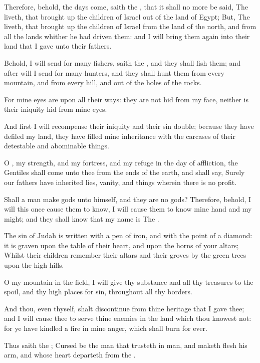 \Verse Therefore, behold, the days come, saith the \LORD, that it shall no more be said, The \LORD liveth, that brought up the children of Israel out of the land of Egypt; \Verse But, The \LORD liveth, that brought up the children of Israel from the land of the north, and from all the lands whither he had driven them: and I will bring them again into their land that I gave unto their fathers.

\Verse Behold, I will send for many fishers, saith the \LORD, and they shall fish them; and after will I send for many hunters, and they shall hunt them from every mountain, and from every hill, and out of the holes of the rocks.

\Verse For mine eyes are upon all their ways: they are not hid from my face, neither is their iniquity hid from mine eyes.

\Verse And first I will recompense their iniquity and their sin double; because they have defiled my land, they have filled mine inheritance with the carcases of their detestable and abominable things.

\Verse O \LORD, my strength, and my fortress, and my refuge in the day of affliction, the Gentiles shall come unto thee from the ends of the earth, and shall say, Surely our fathers have inherited lies, vanity, and things wherein there is no profit.

\Verse Shall a man make gods unto himself, and they are no gods?  \Verse Therefore, behold, I will this once cause them to know, I will cause them to know mine hand and my might; and they shall know that my name is The \LORD.


\Chapter
\Verse The sin of Judah is written with a pen of iron, and with the point of a diamond: it is graven upon the table of their heart, and upon the horns of your altars; \Verse Whilst their children remember their altars and their groves by the green trees upon the high hills.

\Verse O my mountain in the field, I will give thy substance and all thy treasures to the spoil, and thy high places for sin, throughout all thy borders.

\Verse And thou, even thyself, shalt discontinue from thine heritage that I gave thee; and I will cause thee to serve thine enemies in the land which thou knowest not: for ye have kindled a fire in mine anger, which shall burn for ever.

\Verse Thus saith the \LORD; Cursed be the man that trusteth in man, and maketh flesh his arm, and whose heart departeth from the \LORD.

